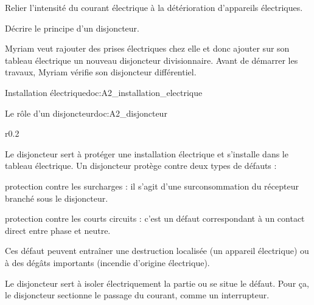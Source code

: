 \tetePremStssElec

\vspace*{-36pt}

\begin{objectifs}
  \item Relier l'intensité du courant électrique à la détérioration d'appareils électriques.
  \item Décrire le principe d'un disjoncteur.
\end{objectifs}



\begin{contexte}  
  Myriam veut rajouter des prises électriques chez elle et donc ajouter sur son tableau électrique un nouveau disjoncteur divisionnaire.
  Avant de démarrer les travaux, Myriam vérifie son disjoncteur différentiel.

\end{contexte}

\begin{doc}{Installation électrique}{doc:A2_installation_electrique}
  \begin{center}
  \end{center}
\end{doc}

\begin{doc}{Le rôle d'un disjoncteur}{doc:A2_disjoncteur}
  \begin{wrapfigure}[8]{r}{0.2\linewidth}
    \vspace*{-24pt}
    \centering
  \end{wrapfigure}
  Le disjoncteur sert à protéger une installation électrique et s'installe dans le tableau électrique.
  Un disjoncteur protège contre deux types de défauts :
  \begin{listePoints}
    \item protection contre les surcharges : il s'agit d'une surconsommation du récepteur branché sous le disjoncteur.
    \item protection contre les courts circuits : c'est un défaut correspondant à un contact direct entre phase et neutre.
  \end{listePoints}
  Ces défaut peuvent entraîner une destruction localisée (un appareil électrique) ou à des dégâts importants (incendie d'origine électrique).
  
  Le disjoncteur sert à isoler électriquement la partie ou se situe le défaut.
  Pour ça, le disjoncteur sectionne le passage du courant, comme un interrupteur.
\end{doc}

